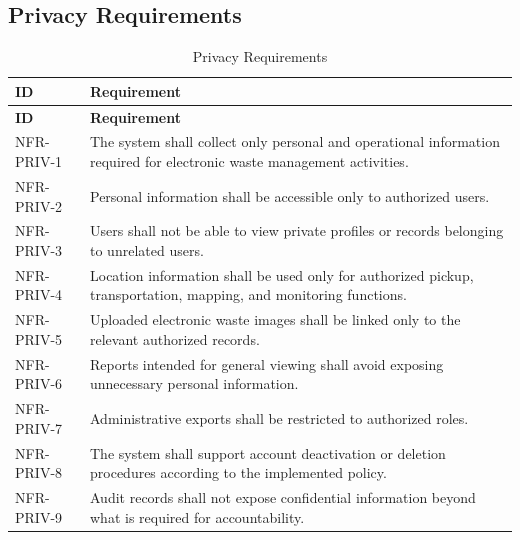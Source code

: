\subsection{Privacy Requirements}
\begin{longtable}{@{}p{2.6cm}p{10.8cm}@{}}
\caption{Privacy Requirements} \label{tab:nfr-priv} \\
\toprule \textbf{ID} & \textbf{Requirement} \\ \midrule
\endfirsthead
\toprule \textbf{ID} & \textbf{Requirement} \\ \midrule
\endhead
NFR-PRIV-1 & The system shall collect only personal and operational information required for electronic waste management activities. \\
NFR-PRIV-2 & Personal information shall be accessible only to authorized users. \\
NFR-PRIV-3 & Users shall not be able to view private profiles or records belonging to unrelated users. \\
NFR-PRIV-4 & Location information shall be used only for authorized pickup, transportation, mapping, and monitoring functions. \\
NFR-PRIV-5 & Uploaded electronic waste images shall be linked only to the relevant authorized records. \\
NFR-PRIV-6 & Reports intended for general viewing shall avoid exposing unnecessary personal information. \\
NFR-PRIV-7 & Administrative exports shall be restricted to authorized roles. \\
NFR-PRIV-8 & The system shall support account deactivation or deletion procedures according to the implemented policy. \\
NFR-PRIV-9 & Audit records shall not expose confidential information beyond what is required for accountability. \\
\bottomrule
\end{longtable}

